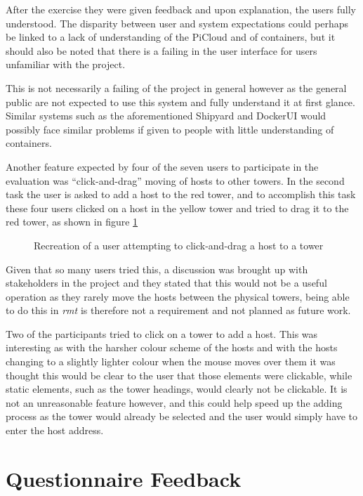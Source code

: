 After the exercise they were given feedback and upon explanation, the users fully understood.
The disparity between user and system expectations could perhaps be linked to a lack of understanding of the PiCloud and of containers, but it should also be noted that there is a failing in the user interface for users unfamiliar with the project.

This is not necessarily a failing of the project in general however as the general public are not expected to use this system and fully understand it at first glance.
Similar systems such as the aforementioned Shipyard and DockerUI would possibly face similar problems if given to people with little understanding of containers.

Another feature expected by four of the seven users to participate in the evaluation was ``click-and-drag'' moving of hosts to other towers.
In the second task the user is asked to add a host to the red tower, and to accomplish this task these four users clicked on a host in the yellow tower and tried to drag it to the red tower, as shown in figure \ref{fig:clickanddrag}

\begin{figure}[t]
	\centering
	\setlength\fboxsep{0pt}
	\setlength\fboxrule{0.5pt}
	\caption{Recreation of a user attempting to click-and-drag a host to a tower}
	\label{fig:clickanddrag}
\end{figure}

Given that so many users tried this, a discussion was brought up with stakeholders in the project and they stated that this would not be a useful operation as they rarely move the hosts between the physical towers, being able to do this in \emph{rmt} is therefore not a requirement and not planned as future work.

Two of the participants tried to click on a tower to add a host.
This was interesting as with the harsher colour scheme of the hosts and with the hosts changing to a slightly lighter colour when the mouse moves over them it was thought this would be clear to the user that those elements were clickable, while static elements, such as the tower headings, would clearly not be clickable.
It is not an unreasonable feature however, and this could help speed up the adding process as the tower would already be selected and the user would simply have to enter the host address.

\section{Questionnaire Feedback}

